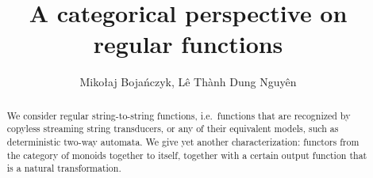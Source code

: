 \documentclass{article}
\begin{document}
\title{A categorical perspective on regular functions}
\author{Miko{\l}aj Boja\'nczyk, L{\^{e}} Th{\`{a}}nh Dung Nguy{\^{e}}n}
\maketitle 
\begin{abstract}
    We consider regular string-to-string functions, i.e.~functions that are recognized by copyless streaming string transducers, or  any of their equivalent models, such as deterministic two-way automata. We give yet another characterization: functors from the  category of monoids together to itself, together with a certain output function that is a natural transformation. 
\end{abstract}


\newcommand{\moncat}{\mathrm{Mon}}
\newcommand{\semcat}{\mathrm{Sem}}










\end{document}

